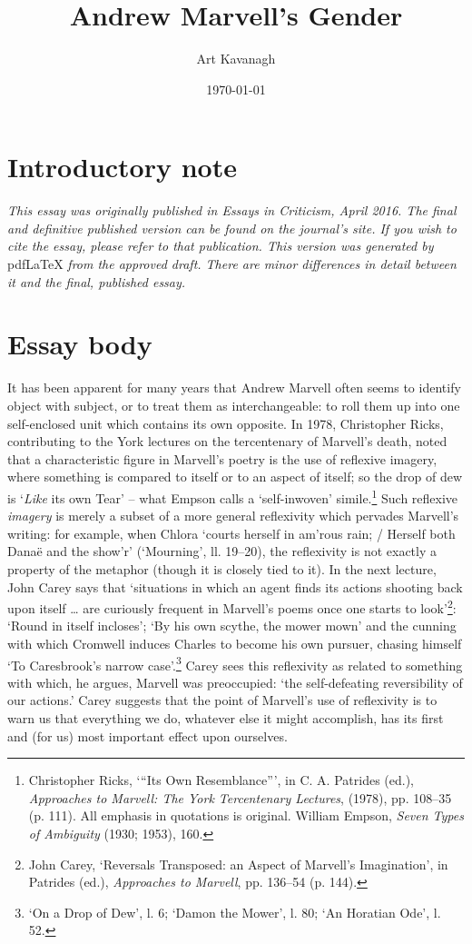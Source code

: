 ﻿\documentclass[12pt]{article}
\title{Andrew Marvell’s Gender}
\author{Art Kavanagh}
\date{\today}
\newcommand{\citedtitle}[1]{\textit{#1}}
\begin{document}
\maketitle

\section*{Introductory note}
\textit{This essay was originally published in \textrm{Essays in Criticism}, April 2016. The final and definitive published version can be found on the journal’s site. If you wish to cite the essay, please refer to that publication. This version was generated by} pdf\LaTeX{} \textit{from the approved draft. There are minor differences in detail between it and the final, published essay.}

\section*{Essay body}
It
has been apparent for many years that Andrew Marvell often seems to identify
object with subject, or to treat them as interchangeable: to roll them up into
one self-enclosed unit which contains its own opposite. In 1978, Christopher
Ricks, contributing to the York lectures on the tercentenary of Marvell’s
death, noted that a characteristic figure in Marvell’s poetry is the use of
reflexive imagery, where something is compared to itself or to an aspect of
itself; so the drop of dew is ‘\emph{Like} its own Tear’ – what Empson calls
a ‘self-inwoven’ simile.\footnote{Christopher Ricks, ‘“Its
Own Resemblance”’, in C. A. Patrides (ed.), \citedtitle{Approaches to Marvell:
The York Tercentenary Lectures}, (1978), pp. 108–35 (p. 111). All emphasis in
quotations is original.  William Empson, \citedtitle{Seven Types of Ambiguity} (1930;
1953), 160.}
Such reflexive \emph{imagery} is merely a subset of a
more general reflexivity which pervades Marvell’s writing: for example, when
Chlora ‘courts herself in am’rous rain; / Herself both Danaë and the show’r’
(‘Mourning’, ll. 19–20), the reflexivity is not exactly a property of the
metaphor (though it is closely tied to it). In the next lecture, John Carey
says that ‘situations in which an agent finds its actions shooting back upon
itself … are curiously frequent in Marvell’s poems once one starts to look’\footnote{John Carey, ‘Reversals
Transposed: an Aspect of Marvell’s Imagination’, in Patrides (ed.), \citedtitle{Approaches
to Marvell}, pp. 136–54 (p. 144).}: ‘Round
in itself incloses’; ‘By his own scythe, the mower mown’ and the cunning with
which Cromwell induces Charles to become his own pursuer, chasing himself ‘To
Caresbrook’s narrow case’.\footnote{‘On a Drop of Dew’, l.
6; ‘Damon the Mower’, l. 80; ‘An Horatian Ode’, l. 52.}
Carey sees this reflexivity as related to something with which, he argues,
Marvell was preoccupied: ‘the self-defeating reversibility of our actions.’
Carey suggests that the point of Marvell’s use of reflexivity is to warn us
that everything we do, whatever else it might accomplish, has its first and
(for us) most important effect upon ourselves.
\end{document}
